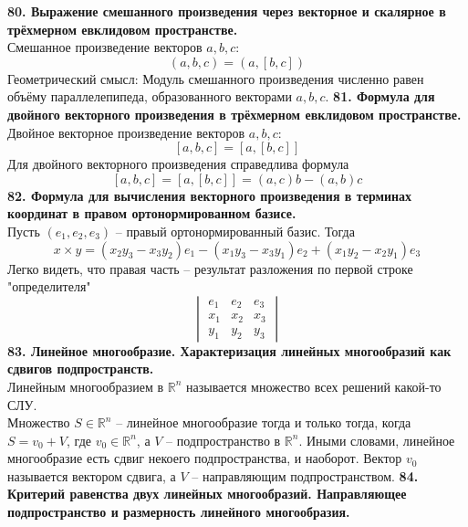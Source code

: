 \documentclass{article}
\begin{document}
\newline
\newline
\textbf{80. Выражение смешанного произведения через векторное и скалярное в трёхмерном евклидовом пространстве.}\\
   Смешанное произведение векторов $a, b, c$:
   $$
       (a, b, c) = (a, [b, c])
   $$
   Геометрический смысл: Модуль смешанного произведения численно равен объёму параллелепипеда, образованного векторами $a, b, c$.
\newline
\newline
\textbf{81. Формула для двойного векторного произведения в трёхмерном евклидовом пространстве.}\\
   Двойное векторное произведение векторов $a, b, c$:
   $$
       [a, b, c] = [a, [b, c]]
   $$
   Для двойного векторного произведения справедлива формула
   $$
       [a, b, c] = [a, [b, c]] = (a, c)b - (a, b)c
   $$
\newline
\textbf{82. Формула для вычисления векторного произведения в терминах координат в правом ортонормированном базисе.}\\
   Пусть $(e_1, e_2, e_3)$ -- правый ортонормированный базис. Тогда
   $$
       x \times y = (x_2y_3 - x_3y_2)e_1 - (x_1y_3 - x_3y_1)e_2 + (x_1y_2 - x_2y_1)e_3
   $$
   Легко видеть, что правая часть -- результат разложения по первой строке "определителя"
   $$
       \begin{vmatrix}
           e_1 & e_2 & e_3 \\
           x_1 & x_2 & x_3 \\
           y_1 & y_2 & y_3
       \end{vmatrix}
   $$
\newline
\textbf{83. Линейное многообразие. Характеризация линейных многообразий как сдвигов подпространств.}\\
   Линейным многообразием в $\mathbb{R}^n$ называется множество всех решений какой-то СЛУ. \\
   Множество $S \in \mathbb{R}^n$ -- линейное многообразие тогда и только тогда, когда $S = v_0 + V$, где $v_0 \in \mathbb{R}^n$, а $V$ -- подпространство в $\mathbb{R}^n$. Иными словами, линейное многообразие есть сдвиг некоего подпространства, и наоборот. Вектор $v_0$ называется вектором сдвига, а $V$ -- направляющим подпространством.
\newline
\newline
\textbf{84. Критерий равенства двух линейных многообразий. Направляющее подпространство и размерность линейного
многообразия.}\\
\end{document}
